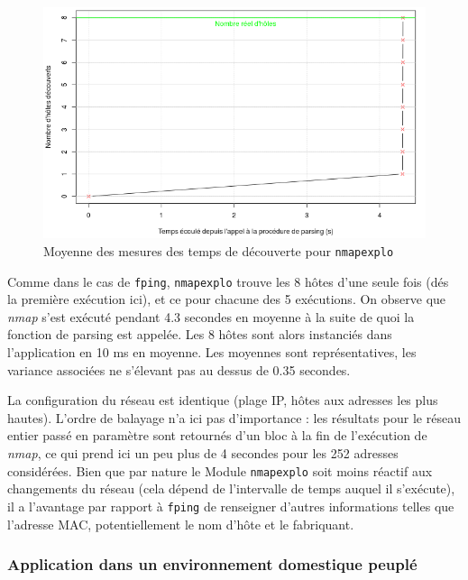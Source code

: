 \documentclass[]{article}
\begin{document}
\begin{figure}[!ht]
\centering
     \includegraphics[width=0.75\linewidth]{explomean}
     \caption{Moyenne des mesures des temps de découverte pour \texttt{nmapexplo}}
     \label{explomean}
\end{figure}

\vspace{0.1cm}

\par Comme dans le cas de \texttt{fping}, \texttt{nmapexplo} trouve les 8 hôtes d'une seule fois (dés la première exécution ici), et ce pour chacune des 5 exécutions. On observe que \textit{nmap} s'est exécuté pendant 4.3 secondes en moyenne à la suite de quoi la fonction de parsing est appelée. Les 8 hôtes sont alors instanciés dans l'application en 10 ms en moyenne. Les moyennes sont représentatives, les variance associées ne s'élevant pas au dessus de 0.35 secondes.\\

\par La configuration du réseau est identique (plage IP, hôtes aux adresses les plus hautes). L'ordre de balayage n'a ici pas d'importance : les résultats pour le réseau entier passé en paramètre sont retournés d'un bloc à la fin de l'exécution de \textit{nmap}, ce qui prend ici un peu plus de 4 secondes pour les 252 adresses considérées. Bien que par nature le Module \texttt{nmapexplo} soit moins réactif aux changements du réseau (cela dépend de l'intervalle de temps auquel il s'exécute), il a l'avantage par rapport à \texttt{fping} de renseigner d'autres informations telles que l'adresse MAC, potentiellement le nom d'hôte et le fabriquant.

\newpage

\subsubsection{Application dans un environnement domestique peuplé}
\end{document}
